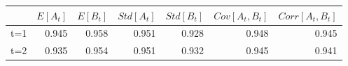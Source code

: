 \begin{tabular}{lrrrrrr}
\toprule
{} &  $E[A_t]$ &  $E[B_t]$ &  $Std[A_t]$ &  $Std[B_t]$ &  $Cov[A_t, B_t]$ &  $Corr[A_t, B_t]$ \\
\midrule
t=1 &     0.945 &     0.958 &       0.951 &       0.928 &            0.948 &             0.945 \\
t=2 &     0.935 &     0.954 &       0.951 &       0.932 &            0.945 &             0.941 \\
\bottomrule
\end{tabular}
